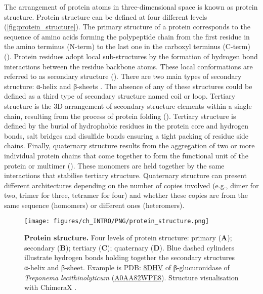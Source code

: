 The arrangement of protein atoms in three-dimensional space is known as protein structure. Protein structure can be defined at four different levels (\autoref{fig:protein_structure}). The primary structure of a protein corresponds to the sequence of amino acids forming the polypeptide chain from the first residue in the amino terminus (N-term) to the last one in the carboxyl terminus (C-term) (). Protein residues adopt local sub-structures by the formation of hydrogen bond interactions between the residue backbone atoms. These local conformations are referred to as secondary structure (). There are two main types of secondary structure: α-helix and β-sheets \cite{PAULING_1951_SS}. The absence of any of these structures could be defined as a third type of secondary structure named coil or loop. Tertiary structure is the 3D arrangement of secondary structure elements within a single chain, resulting from the process of protein folding (). Tertiary structure is defined by the burial of hydrophobic residues in the protein core and hydrogen bonds, salt bridges and disulfide bonds ensuring a tight packing of residue side chains. Finally, quaternary structure results from the aggregation of two or more individual protein chains that come together to form the functional unit of the protein or multimer (). These monomers are held together by the same interactions that stabilise tertiary structure. Quaternary structure can present different architectures depending on the number of copies involved (e.g., dimer for two, trimer for three, tetramer for four) and whether these copies are from the same sequence (homomers) or different ones (heteromers).

\begin{figure}[htb!]
    \centering
    \texttt{[image: figures/ch\_INTRO/PNG/protein\_structure.png]}
    \caption[Protein structure]{\textbf{Protein structure.} Four levels of protein structure: primary (\textbf{A}); secondary (\textbf{B}); tertiary (\textbf{C}); quaternary (\textbf{D}). Blue dashed cylinders illustrate hydrogen bonds holding together the secondary structures α-helix and β-sheet. Example is PDB: \href{https://www.ebi.ac.uk/pdbe/entry/pdb/8dhv}{8DHV} \cite{LIETZAN_2023_BETAGLUCO} of β-glucuronidase of \textit{Treponema lecithinolyticum} (\href{https://www.uniprot.org/uniprotkb/A0AA82WPE8/entry}{A0AA82WPE8}). Structure visualisation with ChimeraX \cite{PETTERSEN_2021_CHIMERAX}.}
    \label{fig:protein_structure}
\end{figure}

